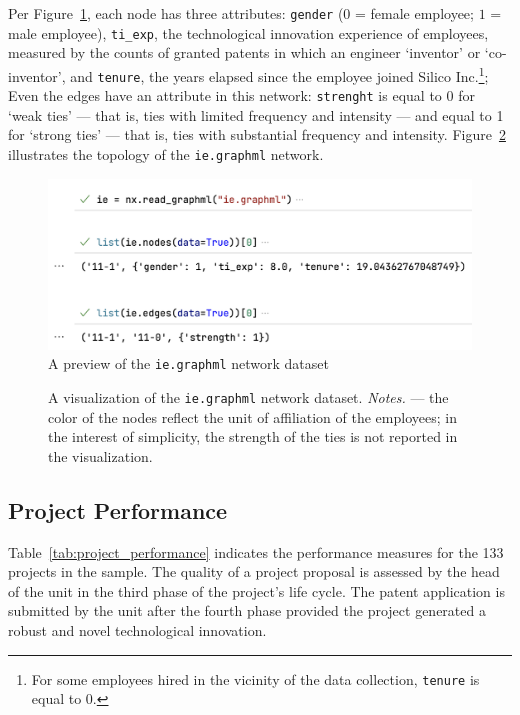 \documentclass[11pt]{article}
\begin{document}
Per Figure~\ref{fig:ie}, each node has three attributes: \texttt{gender} ($0$ = 
female employee; $1$ = male employee), \texttt{ti\_exp}, the technological innovation
experience of employees, measured by the counts of granted patents in which an
engineer `inventor' or `co-inventor', and \texttt{tenure}, the years elapsed since
the employee joined Silico Inc.\footnote{For some employees hired in the 
vicinity of the data collection, \texttt{tenure} is equal to $0$.};  Even the
edges have an attribute in this network: \texttt{strenght} is equal to $0$ for
`weak ties' --- that is, ties with limited frequency and intensity --- and equal
to 1 for `strong ties' --- that is, ties with substantial frequency and
intensity.  Figure~\ref{fig:nviz} illustrates the topology of the
\texttt{ie.graphml} network.

\begin{figure}
	\centering
	\includegraphics[width=1\textwidth]{ie.png}
	\caption{A preview of the
	 \texttt{ie.graphml} network dataset}
	\label{fig:ie}
\end{figure}

\begin{figure}
	\centering
	
	\caption{A visualization of the \texttt{ie.graphml} network dataset. 
	\textit{Notes.} --- the color of the nodes reflect the unit 
	of affiliation of the employees; in the interest of simplicity,
	the strength of the ties is not reported in the visualization.}
	\label{fig:nviz}
\end{figure}

\subsection{Project Performance}

Table~\ref{tab:project_performance} indicates the performance measures
for the 133 projects in the sample. The quality of a project proposal 
is assessed by the head of the unit in the third phase of the project's life 
cycle. The patent application is submitted by the unit after the fourth phase 
provided the project generated a robust and novel technological innovation.
\end{document}
